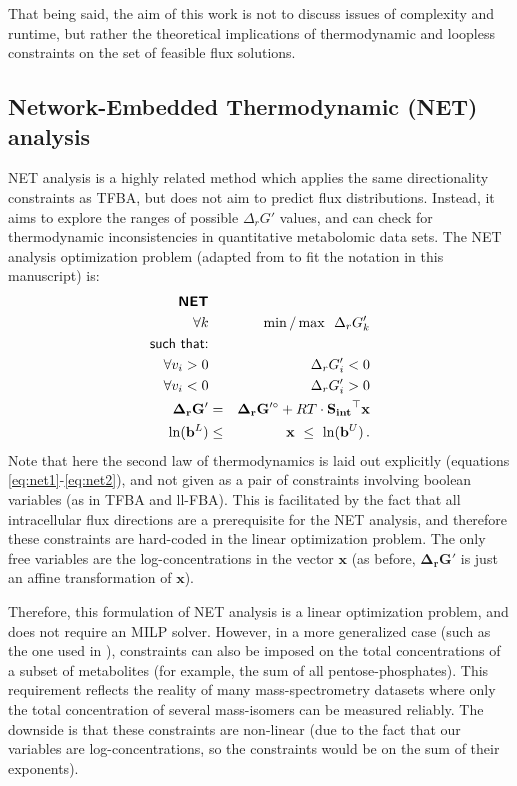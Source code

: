 \documentclass[twocolumn]{article}
\newcommand{\Sint}{\mathbf{S_{int}}}
\begin{document}
That being said, the aim of this work is not to discuss issues of complexity and runtime, but rather the theoretical implications of thermodynamic and loop\-less constraints on the set of feasible flux solutions.

\subsection{Network-Embedded Thermodynamic (NET) analysis}
NET analysis \cite{Kummel2006-px} is a highly related method which applies the same directionality constraints as TFBA, but does not aim to predict flux distributions. Instead, it aims to explore the ranges of possible $\Delta_r G'$ values, and can check for thermodynamic inconsistencies in quantitative metabolomic data sets. The NET analysis optimization problem (adapted from \cite{Kummel2006-px} to fit the notation in this manuscript) is:
\begin{eqnarray}
\textsf{\textbf{NET}} && \nonumber\\
\forall k && \mathrm{\min/\max} ~~\Delta_r G'_k\nonumber\\
\textsf{such that:} && \nonumber\\
\forall  v_i > 0 && \Delta_r G'_i < 0 \label{eq:net1}\\
\forall  v_i < 0 && \Delta_r G'_i > 0 \label{eq:net2}\\
\mathbf{\Delta_r G'} &=& \mathbf{\Delta_r G'^\circ} + RT \cdot \Sint^\top \mathbf{x} \\
\ln(\mathbf{b}^L) &\leq& \mathbf{x} ~\leq~ \ln(\mathbf{b}^U)\,.
\end{eqnarray}
Note that here the second law of thermodynamics is laid out explicitly (equations \ref{eq:net1}-\ref{eq:net2}), and not given as a pair of constraints involving boolean variables (as in TFBA and ll-FBA). This is facilitated by the fact that all intracellular flux directions are a prerequisite for the NET analysis, and therefore these constraints are hard-coded in the linear optimization problem. The only free variables are the log-concentrations in the vector $\mathbf{x}$ (as before, $\mathbf{\Delta_r G'}$ is just an affine transformation of $\mathbf{x}$).

Therefore, this formulation of NET analysis is a linear optimization problem, and does not require an MILP solver. However, in a more generalized case (such as the one used in \cite{Kummel2006-px}), constraints can also be imposed on the total concentrations of a subset of metabolites (for example, the sum of all pentose-phosphates). This requirement reflects the reality of many mass-spectrometry datasets where only the total concentration of several mass-isomers can be measured reliably. The downside is that these constraints are non-linear (due to the fact that our variables are log-concentrations, so the constraints would be on the sum of their exponents). 
\end{document}

